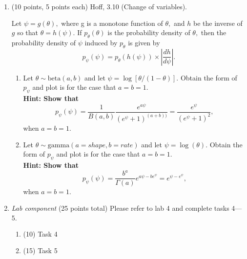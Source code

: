 \documentclass{article}
\begin{document}
\begin{enumerate}
\item (10 points, 5 points each) Hoff, 3.10 (Change of variables). 

Let $\psi= g(\theta),$ where g is a monotone function of $\theta,$ and $h$ be the inverse of $g$ so that $\theta = h(\psi).$ If $p_{\theta}(\theta)$ is the probability density of $\theta,$ then the probability density of $\psi$ induced by $p_{\theta}$ is given by 
$$p_{\psi}(\psi) = p_{\theta}(h(\psi)) \times | \frac{dh}{d\psi} |.$$
\begin{enumerate}
\item Let $\theta \sim \text{beta}(a,b)$ and let $\psi = \log[\theta/(1- \theta)].$ Obtain the form of $p_{\psi}$ and plot is for the case that $a=b=1.$  \\
\textbf{Hint: Show that $$p_{\psi}(\psi) = \frac{1}{B(a,b)}
\frac{e^{a\psi}}{(e^{\psi} + 1)^{(a+b))}} = \frac{e^{\psi}}{(e^{\psi} + 1)^2},$$} when $a=b=1.$
\item Let $\theta \sim \text{gamma}(a = shape,b = rate)$ and let $\psi = \log(\theta).$ Obtain the form of $p_{\psi}$ and plot is for the case that $a=b=1.$ \\
\textbf{Hint: Show that $$p_{\psi}(\psi) = \frac{b^{a}}{\Gamma(a)} e^{a\psi - be^{\psi}} = e^{\psi - e^{\psi}},$$} when $a=b=1.$
\end{enumerate}



\item {\em Lab component} 
  (25 points total) Please refer to lab 4 and complete tasks 4---5. 
  \begin{enumerate}
  \item (10) Task 4
  \item (15) Task 5
  \end{enumerate}
  
\end{enumerate}
\end{document}

